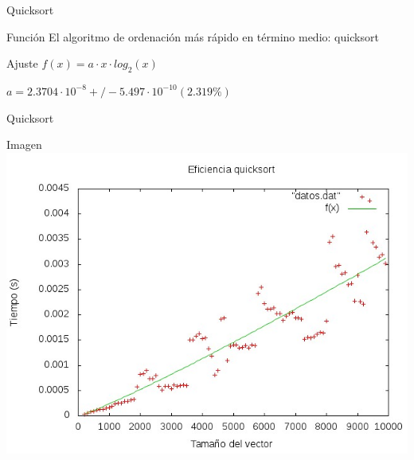 \documentclass[compress]{beamer}
\begin{document}

\begin{frame}{Quicksort}
	\begin{block}{Función}
	El algoritmo de ordenación más rápido en término medio: quicksort
	\end{block}
	
	\begin{block}{Ajuste}
	$f(x) = a\cdot x\cdot log_2(x)$

	$a               = 2.3704\cdot 10^{-8}       +/- 5.497\cdot 10^{-10}    (2.319\%) $
	\end{block}
\end{frame}
\begin{frame}{Quicksort}
	\begin{alertblock}{Imagen}
	\includegraphics[scale=0.55]{../Graficas/Quicksort/quicksortO0_ruben.jpeg}
	\end{alertblock}
\end{frame}

\end{document}
